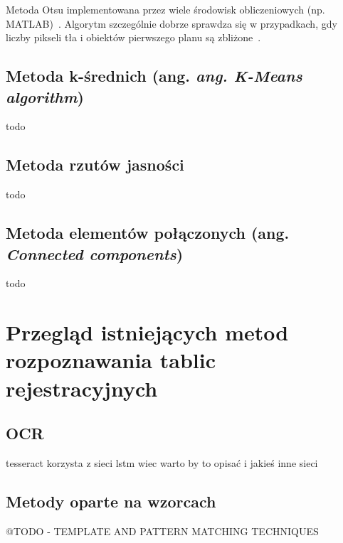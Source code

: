 Metoda Otsu implementowana przez wiele środowisk obliczeniowych (np. MATLAB)~\cite{otsu_inzynieria_rolnicza}.
Algorytm szczególnie dobrze sprawdza się w przypadkach, gdy liczby pikseli tła i obiektów pierwszego planu są zbliżone~\cite{10.1117/1.1631315}.

\subsection{Metoda k-średnich (ang. \textit{ang. K-Means algorithm})}
todo~\cite{segmentation_kmeans}

\subsection{Metoda rzutów jasności}
todo

\subsection{Metoda elementów połączonych (ang. \textit{Connected components})}
todo


\section{Przegląd istniejących metod rozpoznawania tablic rejestracyjnych}

\subsection{OCR}
tesseract korzysta z sieci lstm wiec warto by to opisać i jakieś inne sieci

\subsection{Metody oparte na wzorcach}
@TODO - TEMPLATE AND PATTERN MATCHING TECHNIQUES